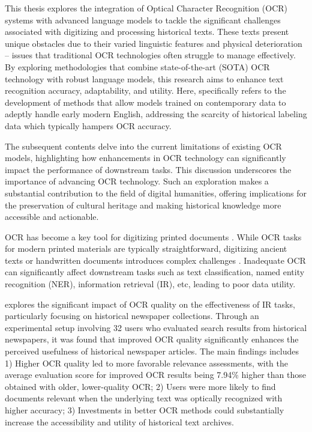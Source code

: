 \label{chap:1_introduction_and_motivation}
This thesis explores the integration of Optical Character Recognition (OCR) systems with advanced language models to tackle the significant challenges associated with digitizing and processing historical texts. These texts present unique obstacles due to their varied linguistic features and physical deterioration -- issues that traditional OCR technologies often struggle to manage effectively. By exploring methodologies that combine state-of-the-art (SOTA) OCR technology with robust language models, this research aims to enhance text recognition accuracy, adaptability, and utility. Here,  specifically refers to the development of methods that allow models trained on contemporary data to adeptly handle early modern English, addressing the scarcity of historical labeling data which typically hampers OCR accuracy.

The subsequent contents delve into the current limitations of existing OCR models, highlighting how enhancements in OCR technology can significantly impact the performance of downstream tasks. This discussion underscores the importance of advancing OCR technology. Such an exploration makes a substantial contribution to the field of digital humanities, offering implications for the preservation of cultural heritage and making historical knowledge more accessible and actionable.

OCR has become a key tool for digitizing printed documents \citep{singh2012survey}. While OCR tasks for modern printed materials are typically straightforward, digitizing ancient texts or handwritten documents introduces complex challenges \citep{neudecker2019ocr}. Inadequate OCR can significantly affect downstream tasks such as text classification, named entity recognition (NER), information retrieval (IR), etc, leading to poor data utility. 

\cite{kettunen2022ocr} explores the significant impact of OCR quality on the effectiveness of IR tasks, particularly focusing on historical newspaper collections. Through an experimental setup involving 32 users who evaluated search results from historical newspapers, it was found that improved OCR quality significantly enhances the perceived usefulness of historical newspaper articles. The main findings includes 1) Higher OCR quality led to more favorable relevance assessments, with the average evaluation score for improved OCR results being 7.94\% higher than those obtained with older, lower-quality OCR; 2) Users were more likely to find documents relevant when the underlying text was optically recognized with higher accuracy; 3) Investments in better OCR methods could substantially increase the accessibility and utility of historical text archives.

